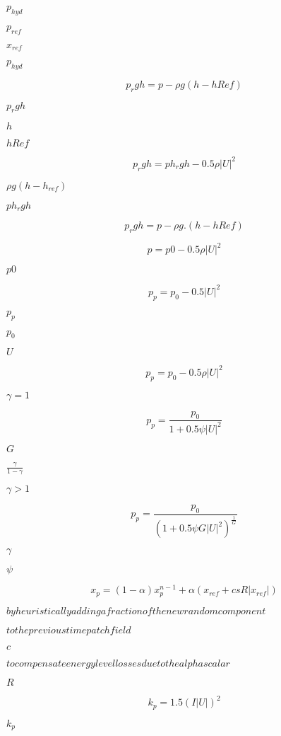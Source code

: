 \documentclass{article}
\begin{document}
$ p_{hyd} $
\pagebreak

$ p_{ref} $
\pagebreak

$ x_{ref} $
\pagebreak

$p_{hyd}$
\pagebreak

\[ p_rgh = p - \rho g (h - hRef) \]
\pagebreak

$ p_rgh $
\pagebreak

$ h $
\pagebreak

$ hRef $
\pagebreak

\[ p_rgh = ph_rgh - 0.5 \rho |U|^2 \]
\pagebreak

$ \rho g (h - h_{ref}) $
\pagebreak

$ ph_rgh $
\pagebreak

\[ p_rgh = p - \rho g.(h - hRef) \]
\pagebreak

\[ p = p0 - 0.5 \rho |U|^2 \]
\pagebreak

$ p0 $
\pagebreak

\[ p_p = p_0 - 0.5 |U|^2 \]
\pagebreak

$ p_p $
\pagebreak

$ p_0 $
\pagebreak

$ U $
\pagebreak

\[ p_p = p_0 - 0.5 \rho |U|^2 \]
\pagebreak

$\gamma = 1$
\pagebreak

\[ p_p = \frac{p_0}{1 + 0.5 \psi |U|^2} \]
\pagebreak

$ G $
\pagebreak

$\frac{\gamma}{1-\gamma}$
\pagebreak

$\gamma > 1$
\pagebreak

\[ p_p = \frac{p_0}{(1 + 0.5 \psi G |U|^2)^{\frac{1}{G}}} \]
\pagebreak

$ \gamma $
\pagebreak

$ \psi $
\pagebreak

\[ x_p = (1 - \alpha) x_p^{n - 1} + \alpha (x_{ref} + c s R |x_{ref}|) \]
\pagebreak

$ by heuristically adding a fraction of the new random component$
\pagebreak

$ to the previous time patch field$
\pagebreak

$ c $
\pagebreak

$ to compensate energy level losses due to the alpha scalar$
\pagebreak

$ R $
\pagebreak

\[ k_p = 1.5 (I |U|)^2 \]
\pagebreak

$ k_p $
\pagebreak
\end{document}

